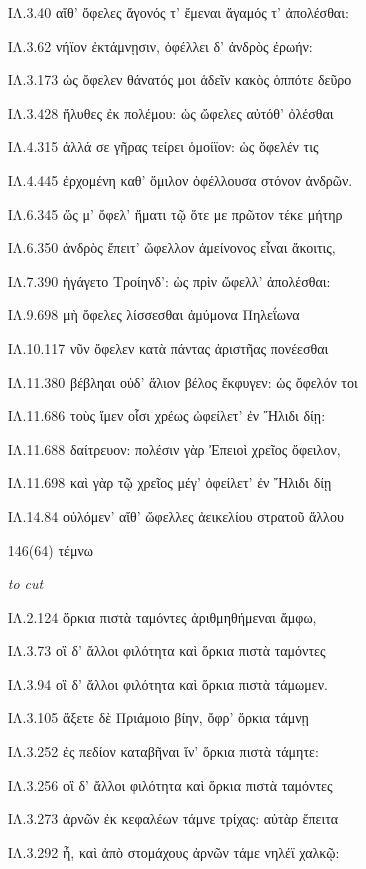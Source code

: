 \begin{enumerate}
{ΙΛ.3.40 αἴθ' ὄφελες ἄγονός τ' ἔμεναι ἄγαμός τ' ἀπολέσθαι:

ΙΛ.3.62 νήϊον ἐκτάμνῃσιν, ὀφέλλει δ' ἀνδρὸς ἐρωήν:

ΙΛ.3.173 ὡς ὄφελεν θάνατός μοι ἁδεῖν κακὸς ὁππότε δεῦρο

ΙΛ.3.428 ἤλυθες ἐκ πολέμου: ὡς ὤφελες αὐτόθ' ὀλέσθαι

ΙΛ.4.315 ἀλλά σε γῆρας τείρει ὁμοίϊον: ὡς ὄφελέν τις

ΙΛ.4.445 ἐρχομένη καθ' ὅμιλον ὀφέλλουσα στόνον ἀνδρῶν.

ΙΛ.6.345 ὥς μ' ὄφελ' ἤματι τῷ ὅτε με πρῶτον τέκε μήτηρ

ΙΛ.6.350 ἀνδρὸς ἔπειτ' ὤφελλον ἀμείνονος εἶναι ἄκοιτις,

ΙΛ.7.390 ἠγάγετο Τροίηνδ': ὡς πρὶν ὤφελλ' ἀπολέσθαι:

ΙΛ.9.698 μὴ ὄφελες λίσσεσθαι ἀμύμονα Πηλεΐωνα

ΙΛ.10.117 νῦν ὄφελεν κατὰ πάντας ἀριστῆας πονέεσθαι

ΙΛ.11.380 βέβληαι οὐδ' ἅλιον βέλος ἔκφυγεν: ὡς ὄφελόν τοι

ΙΛ.11.686 τοὺς ἴμεν οἷσι χρέως ὠφείλετ' ἐν Ἤλιδι δίῃ:

ΙΛ.11.688 δαίτρευον: πολέσιν γὰρ Ἐπειοὶ χρεῖος ὄφειλον,

ΙΛ.11.698 καὶ γὰρ τῷ χρεῖος μέγ' ὀφείλετ' ἐν Ἤλιδι δίῃ

ΙΛ.14.84 οὐλόμεν' αἴθ' ὤφελλες ἀεικελίου στρατοῦ ἄλλου

}

\clearpage
\item[\large 146(64)]{\large \g τέμνω	}

\hspace{0.2cm} \textit{ to cut }

{\g
ΙΛ.2.124 ὅρκια πιστὰ ταμόντες ἀριθμηθήμεναι ἄμφω,

ΙΛ.3.73 οἳ δ' ἄλλοι φιλότητα καὶ ὅρκια πιστὰ ταμόντες

ΙΛ.3.94 οἳ δ' ἄλλοι φιλότητα καὶ ὅρκια πιστὰ τάμωμεν.

ΙΛ.3.105 ἄξετε δὲ Πριάμοιο βίην, ὄφρ' ὅρκια τάμνῃ

ΙΛ.3.252 ἐς πεδίον καταβῆναι ἵν' ὅρκια πιστὰ τάμητε:

ΙΛ.3.256 οἳ δ' ἄλλοι φιλότητα καὶ ὅρκια πιστὰ ταμόντες

ΙΛ.3.273 ἀρνῶν ἐκ κεφαλέων τάμνε τρίχας: αὐτὰρ ἔπειτα

ΙΛ.3.292 ἦ, καὶ ἀπὸ στομάχους ἀρνῶν τάμε νηλέϊ χαλκῷ:

}
\end{enumerate}
